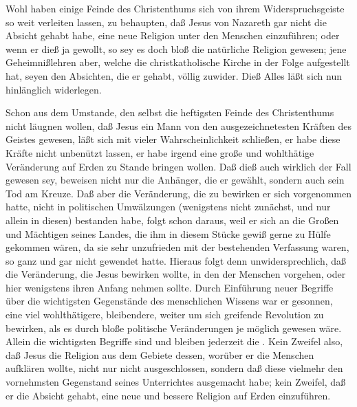 Wohl haben einige Feinde des Christenthums sich von ihrem Widerspruchsgeiste so weit verleiten lassen, zu behaupten, daß Jesus von Nazareth gar nicht die Absicht gehabt habe, eine neue Religion unter den Menschen einzuführen; oder wenn er dieß ja gewollt, so sey es doch bloß die natürliche Religion gewesen; jene Geheimnißlehren aber, welche die christkatholische Kirche in der Folge aufgestellt hat, seyen den Absichten, die er gehabt, völlig zuwider. Dieß Alles läßt sich nun hinlänglich widerlegen.
\begin{aufza}
\item Schon aus dem Umstande, den selbst die heftigsten Feinde des Christenthums nicht läugnen wollen, daß Jesus ein Mann von den ausgezeichnetesten Kräften des Geistes gewesen, läßt sich mit vieler Wahrscheinlichkeit schließen, er habe diese Kräfte nicht unbenützt lassen, er habe irgend eine große und wohlthätige Veränderung auf Erden zu Stande bringen wollen. Daß dieß auch wirklich der Fall gewesen sey, beweisen nicht nur die Anhänger, die er gewählt, sondern auch sein Tod am Kreuze. Daß aber die Veränderung, die zu bewirken er sich vorgenommen hatte, nicht in politischen Umwälzungen (wenigstens nicht zunächst, und nur allein in diesen) bestanden habe, folgt schon daraus, weil er sich an die Großen und Mächtigen seines Landes, die ihm in diesem Stücke gewiß gerne zu Hülfe gekommen wären, da sie sehr unzufrieden mit der bestehenden Verfassung waren, so ganz und gar nicht gewendet hatte. Hieraus folgt denn unwidersprechlich, daß die Veränderung, die Jesus bewirken wollte, in den  der Menschen vorgehen, oder hier wenigstens ihren Anfang nehmen sollte. Durch Einführung neuer Begriffe über die wichtigsten Gegenstände des menschlichen Wissens war er gesonnen, eine viel wohlthätigere, bleibendere, weiter um sich greifende Revolution zu bewirken, als es durch bloße politische Veränderungen je möglich gewesen wäre. Allein die wichtigsten Begriffe sind und bleiben jederzeit die . Kein Zweifel also, daß Jesus die Religion aus dem Gebiete dessen, worüber er die Menschen aufklären wollte, nicht nur nicht ausgeschlossen, sondern daß diese vielmehr den vornehmsten Gegenstand seines Unterrichtes ausgemacht habe; kein Zweifel, daß er die Absicht gehabt, eine neue und bessere Religion auf Erden einzuführen.

\end{aufza}
